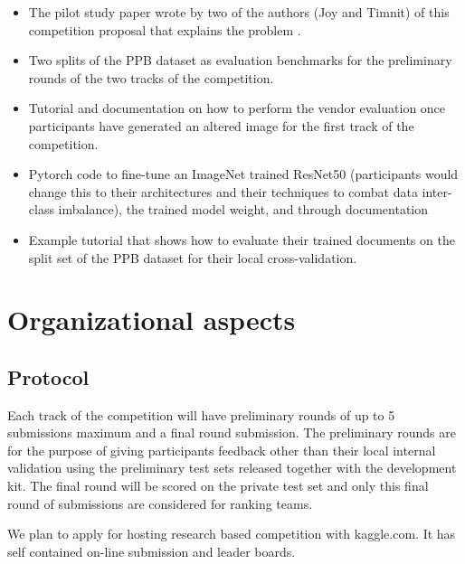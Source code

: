 \documentclass[11pt, oneside]{article}
\makeatletter
\let\@internalcite\cite
\def\cite{\def\citeauthoryear##1##2{##1, ##2}\@internalcite}
\makeatother
\begin{document}
\begin{itemize}
	\item The pilot study paper wrote by two of the authors (Joy and Timnit) of 
	this competition proposal that explains the problem 
	\cite{buolamwini2018gender}.
	\item Two splits of the PPB dataset as evaluation benchmarks for the 
	preliminary rounds of the two tracks of the competition.
	\item Tutorial and documentation on how to perform the vendor evaluation 
	once participants have generated an altered image for the first track of 
	the competition.
	\item Pytorch code to fine-tune an ImageNet trained ResNet50 (participants 
	would change this to their architectures and their techniques to combat 
	data inter-class imbalance), the trained model weight, and through 
	documentation
	\item Example tutorial that shows how to evaluate their trained documents 
	on the split set of the PPB dataset for their local cross-validation.
\end{itemize}

\section{Organizational aspects}
\subsection{Protocol}
\label{sec:protocol}

Each track of the competition will have preliminary rounds of up to 5 
submissions maximum and a final round submission. The preliminary rounds are 
for the purpose of giving participants feedback other than their local internal 
validation using the preliminary test sets released together with the 
development kit. The final round will be scored on the private test set and 
only this final round of submissions are considered for ranking teams.

We plan to apply for hosting research based competition with kaggle.com. It has 
self contained on-line submission and leader boards.
\end{document}

